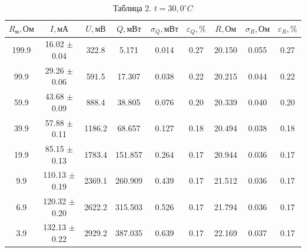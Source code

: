 \documentclass[a4paper]{article}
\begin{document}
\begin{enumerate}
\begin{table}[h!]
    \centering
    \begin{tabular}{|*{9}{c|}}
\hline
        $R_\text{м}, \text{Ом}$ & $I, \text{мА}$ & $U, \text{мВ}$ & $Q, \text{мВт}$ & $\sigma_Q, \text{мВт}$ & $\varepsilon_Q, \%$ & $R, \text{Ом}$ & $\sigma_R,  \text{Ом}$ & $\varepsilon_R, \%$ \\ \hline
        199.9  & 16.02 $\pm$ 0.04 & 322.8  & 5.171  & 0.014  & 0.27  & 20.150  & 0.055  & 0.27 \\ \hline
        99.9   & 29.26 $\pm$ 0.06 & 591.5  & 17.307 & 0.038  & 0.22  & 20.215  & 0.044  & 0.22 \\ \hline
        59.9   & 43.68 $\pm$ 0.09 & 888.4  & 38.805 & 0.076  & 0.20  & 20.339  & 0.040  & 0.20 \\ \hline
        39.9   & 57.88 $\pm$ 0.11 & 1186.2 & 68.657 & 0.127  & 0.18  & 20.494  & 0.038  & 0.18 \\ \hline
        19.9   & 85.15 $\pm$ 0.13 & 1783.4 & 151.857 & 0.264  & 0.17  & 20.944  & 0.036  & 0.17 \\ \hline
        9.9    & 110.13 $\pm$ 0.19 & 2369.1 & 260.909 & 0.439  & 0.17  & 21.512  & 0.036  & 0.17 \\ \hline
        6.9    & 120.32 $\pm$ 0.20 & 2622.2 & 315.503 & 0.526  & 0.17  & 21.794  & 0.036  & 0.17 \\ \hline
        3.9    & 132.13 $\pm$ 0.22 & 2929.2 & 387.035 & 0.639  & 0.17  & 22.169  & 0.037  & 0.17 \\ \hline
    \end{tabular}
    \caption{Таблица 2. $t = 30,0 ^\circ C$ }
\end{table}


\end{enumerate}
\end{document}
